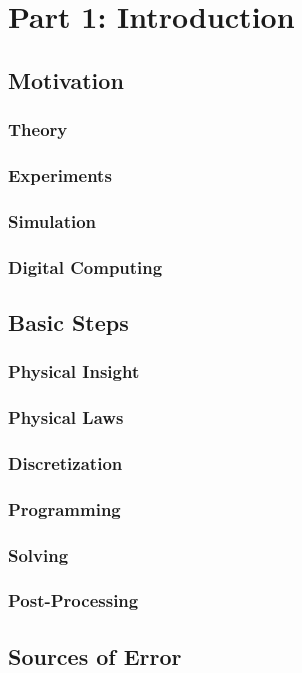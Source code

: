 \part{Part 1: Introduction}


\chapter{Motivation}

\section{Theory}

\section{Experiments}

\section{Simulation}

\section{Digital Computing}

\chapter{Basic Steps}

\section{Physical Insight}

\section{Physical Laws}

\section{Discretization}

\section{Programming}

\section{Solving}

\section{Post-Processing}

\chapter{Sources of Error}